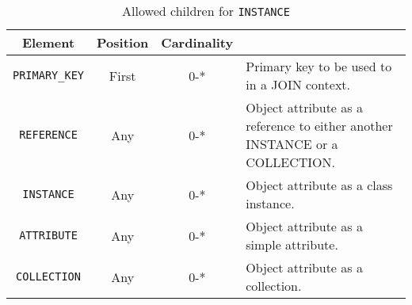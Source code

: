 \begin{table}[!htbp]
\small
\centering
\begin{tabulary}{\linewidth}{|c |c |c|J|}
    \hline 
        \textbf{Element} &
        \textbf{Position} &
        \textbf{Cardinality} &
        \\
    \hline      \hline  
        \texttt{PRIMARY\_KEY}  &        
        First &           
        0-* &
        Primary key to be used to in a JOIN context.\\
    \hline    
        \texttt{REFERENCE}  &        
        Any &           
        0-* &
         Object attribute as a reference to either another INSTANCE or a COLLECTION.\\
    \hline    
        \texttt{INSTANCE} &           
        Any &           
        0-* &
         Object attribute as a class instance. \\
    \hline    
        \texttt{ATTRIBUTE} &           
        Any &           
        0-* &
       Object attribute as a simple attribute. \\
    \hline    
        \texttt{COLLECTION} &           
        Any &           
        0-* &
         Object attribute  as a collection.\\
    \hline 
\end{tabulary}
     \caption{Allowed children for \texttt{INSTANCE}} 
     \label{tbl:instance-chilren}
 \end{table}
 
 
